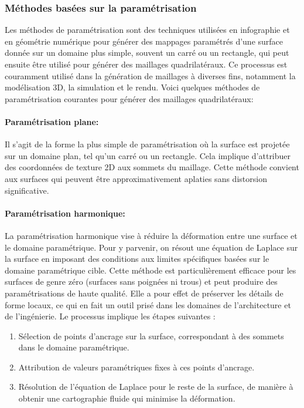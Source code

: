\subsubsection{Méthodes basées sur la paramétrisation}

Les méthodes de paramétrisation sont des techniques utilisées en infographie et en géométrie numérique pour générer des mappages paramétrés d'une surface donnée sur un domaine plus simple, souvent un carré ou un rectangle, qui peut ensuite être utilisé pour générer des maillages quadrilatéraux. Ce processus est couramment utilisé dans la génération de maillages à diverses fins, notamment la modélisation 3D, la simulation et le rendu. Voici quelques méthodes de paramétrisation courantes pour générer des maillages quadrilatéraux:

\paragraph{Paramétrisation plane:} Il s'agit de la forme la plus simple de paramétrisation où la surface est projetée sur un domaine plan, tel qu'un carré ou un rectangle. Cela implique d'attribuer des coordonnées de texture 2D aux sommets du maillage. Cette méthode convient aux surfaces qui peuvent être approximativement aplaties sans distorsion significative.

\paragraph{Paramétrisation harmonique:} La paramétrisation harmonique vise à réduire la déformation entre une surface et le domaine paramétrique. Pour y parvenir, on résout une équation de Laplace sur la surface en imposant des conditions aux limites spécifiques basées sur le domaine paramétrique cible. Cette méthode est particulièrement efficace pour les surfaces de genre zéro (surfaces sans poignées ni trous) et peut produire des paramétrisations de haute qualité. Elle a pour effet de préserver les détails de forme locaux, ce qui en fait un outil prisé dans les domaines de l'architecture et de l'ingénierie. Le processus implique les étapes suivantes :\\

\begin{enumerate}
    \item Sélection de points d'ancrage sur la surface, correspondant à des sommets dans le domaine paramétrique.\\
    \item Attribution de valeurs paramétriques fixes à ces points d'ancrage.\\
    \item Résolution de l'équation de Laplace pour le reste de la surface, de manière à obtenir une cartographie fluide qui minimise la déformation.
\end{enumerate}



